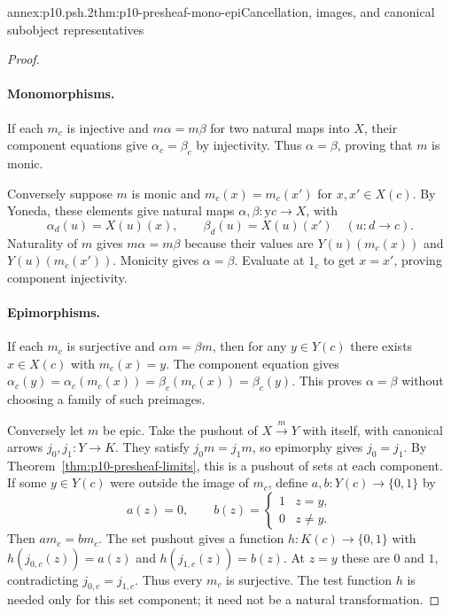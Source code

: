 \begin{annexitem}{annex:p10.psh.2}{thm:p10-presheaf-mono-epi}{Cancellation, images, and canonical subobject representatives}
\begin{proof}
\paragraph{Monomorphisms.}
If each \(m_c\) is injective and \(m\alpha=m\beta\) for
two natural maps into \(X\), their component equations
give \(\alpha_c=\beta_c\) by injectivity.
Thus \(\alpha=\beta\), proving that \(m\) is monic.

Conversely suppose \(m\) is monic and
\(m_c(x)=m_c(x')\) for \(x,x'\in X(c)\).
By Yoneda, these elements give natural maps
\(\alpha,\beta:\mathrm y c\to X\), with
\[
                    \alpha_d(u)=X(u)(x),\qquad
                    \beta_d(u)=X(u)(x')
                         \quad(u:d\to c).
\]
Naturality of \(m\) gives \(m\alpha=m\beta\) because their
values are \(Y(u)(m_c(x))\) and \(Y(u)(m_c(x'))\).
Monicity gives \(\alpha=\beta\).
Evaluate at \(1_c\) to get \(x=x'\), proving component
injectivity.

\paragraph{Epimorphisms.}
If each \(m_c\) is surjective and \(\alpha m=\beta m\),
then for any \(y\in Y(c)\) there exists \(x\in X(c)\)
with \(m_c(x)=y\).
The component equation gives
\(\alpha_c(y)=\alpha_c(m_c(x))=\beta_c(m_c(x))=\beta_c(y)\).
This proves \(\alpha=\beta\) without choosing a family
of such preimages.

Conversely let \(m\) be epic.
Take the pushout of \(X\xrightarrow{m}Y\) with itself,
with canonical arrows \(j_0,j_1:Y\to K\).
They satisfy \(j_0m=j_1m\), so epimorphy gives \(j_0=j_1\).
By Theorem~\ref{thm:p10-presheaf-limits}, this is a
pushout of sets at each component.
If some \(y\in Y(c)\) were outside the image of \(m_c\),
define \(a,b:Y(c)\to\{0,1\}\) by
\[
                  a(z)=0,\qquad
                  b(z)=
                    \begin{cases}1&z=y,\\0&z\ne y.\end{cases}
\]
Then \(a m_c=b m_c\).
The set pushout gives a function \(h:K(c)\to\{0,1\}\)
with \(h(j_{0,c}(z))=a(z)\) and
\(h(j_{1,c}(z))=b(z)\).
At \(z=y\) these are \(0\) and \(1\), contradicting
\(j_{0,c}=j_{1,c}\).
Thus every \(m_c\) is surjective.
The test function \(h\) is needed only for this set
component; it need not be a natural transformation.


\end{proof}
\end{annexitem}
